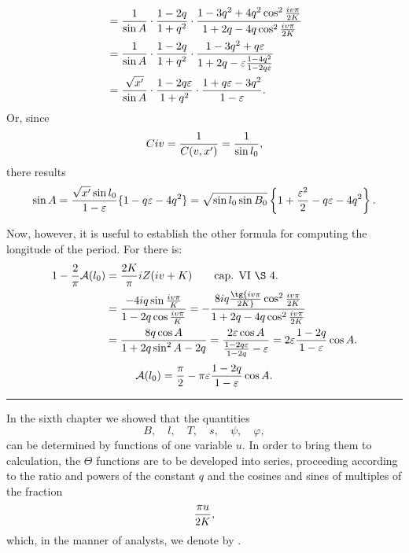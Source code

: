 \begingroup\small
\[
\begin{aligned}
&={1\over\sin A}\cdot{1-2q\over1+q^2}\cdot
 {1-3q^2+4q^2\cos^2{iv\pi\over2K}
  \over 1+2q-4q\cos^2{iv\pi\over2K}}\\
&={1\over\sin A}\cdot{1-2q\over1+q^2}\cdot
 {1-3q^2+q\varepsilon\over 1+2q-\varepsilon{1-4q^2\over1-2q\varepsilon}}\\
&={\sqrt{x'}\over\sin A}\cdot{1-2q\varepsilon\over1+q^2}\cdot {1+q\varepsilon-3q^2\over1-\varepsilon}.
\end{aligned}
\]
Or, since
\[
 Civ={1\over C(v,x')}={1\over \sin l_0},
\]
there results
\[
 \sin A={\sqrt{x'}\sin l_0\over1-\varepsilon}\{1-q\varepsilon-4q^2\}
 =\sqrt{\sin l_0\sin B_0}\left\{1+{\varepsilon^2\over2}-q\varepsilon-4q^2\right\}.
\]


Now, however, it is useful to establish the other formula for computing the longitude of the period. For there is:
\[
\begin{aligned}
1-{2\over\pi}\mathcal A(l_0)&={2K\over\pi}iZ(iv+K)\qquad \text{cap. VI \S\ 4.}\\
&={-4iq\sin {iv\pi\over K}\over 1-2q\cos {iv\pi\over K}}
=-{8iq\tg {iv\pi\over2K}\cos^2{iv\pi\over2K}
\over 1+2q-4q\cos^2{iv\pi\over2K}}\\
&={8q\cos A\over1+2q\sin^2A-2q}
={2\varepsilon\cos A\over {1-2q\varepsilon\over1-2q}-\varepsilon}
=2\varepsilon{1-2q\over1-\varepsilon}\cos A.
\end{aligned}
\]
\[
 \mathcal A(l_0)={\pi\over2}-\pi\varepsilon{1-2q\over1-\varepsilon}\cos A.
\]

\rule{0.35\textwidth}{0.4pt}


In the sixth chapter we showed that the quantities
\[
 B,\quad l,\quad T,\quad s,\quad \psi,\quad \varphi,
\]
can be determined by functions of one variable $u$. In order to bring them to calculation, the $\Theta$ functions are to be developed into series, proceeding according to the ratio and powers of the constant $q$ and the cosines and sines of multiples of the fraction
\[
 {\pi u\over2K},
\]
which, in the manner of analysts, we denote by .

\endgroup
